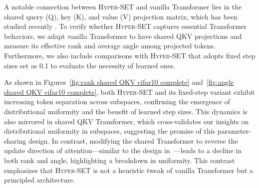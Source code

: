 A notable connection between \textsc{Hyper-SET} and vanilla Transformer lies in the shared query (Q), key (K), and value (V) projection matrix, which has been studied recently \citep{kowsher-etal-2025-self}. To verify whether \textsc{Hyper-SET} captures essential Transformer behaviors, we adapt vanilla Transformer to have shared QKV projections and measure its effective rank and average angle among projected tokens. Furthermore, we also include comparisons with \textsc{Hyper-SET} that adopts fixed step sizes set as 0.1 to evaluate the necessity of learned ones.

As shown in Figures~\ref{fig:rank shared QKV cifar10 complete} and~\ref{fig:angle shared QKV cifar10 complete}, both \textsc{Hyper-SET} and its fixed-step variant exhibit increasing token separation across subspaces, confirming the emergence of distributional uniformity and the benefit of learned step sizes. This dynamics is also mirrored in shared QKV Transformer, which cross-validates our insights on distributional uniformity in subspaces, suggesting the promise of this parameter-sharing design. In contrast, modifying the shared Transformer to reverse the update direction of attention—similar to the design in~—leads to a decline in both rank and angle, highlighting a breakdown in uniformity. This contrast emphasizes that \textsc{Hyper-SET} is not a heuristic tweak of vanilla Transformer but a principled architecture.

